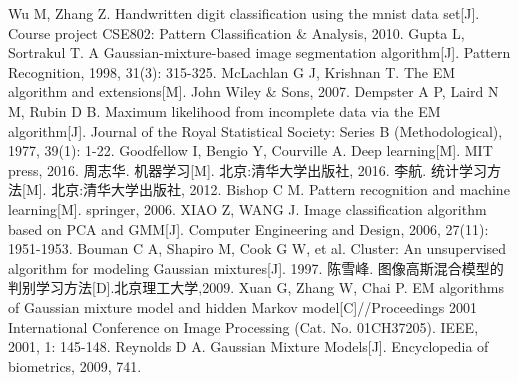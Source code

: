 \documentclass[UTF8]{ctexart}
\begin{document}
\clearpage

\begin{thebibliography}{99}
	Wu M, Zhang Z. Handwritten digit classification using the mnist data set[J]. Course project CSE802: Pattern Classification \& Analysis, 2010.
	Gupta L, Sortrakul T. A Gaussian-mixture-based image segmentation algorithm[J]. Pattern Recognition, 1998, 31(3): 315-325.
	McLachlan G J, Krishnan T. The EM algorithm and extensions[M]. John Wiley \& Sons, 2007. 
	Dempster A P, Laird N M, Rubin D B. Maximum likelihood from incomplete data via the EM algorithm[J]. Journal of the Royal Statistical Society: Series B (Methodological), 1977, 39(1): 1-22. 
	Goodfellow I, Bengio Y, Courville A. Deep learning[M]. MIT press, 2016.
	周志华. 机器学习[M]. 北京:清华大学出版社, 2016.
	李航. 统计学习方法[M]. 北京:清华大学出版社, 2012.
	Bishop C M. Pattern recognition and machine learning[M]. springer, 2006.
	XIAO Z, WANG J. Image classification algorithm based on PCA and GMM[J]. Computer Engineering and Design, 2006, 27(11): 1951-1953.
	Bouman C A, Shapiro M, Cook G W, et al. Cluster: An unsupervised algorithm for modeling Gaussian mixtures[J]. 1997.
	陈雪峰. 图像高斯混合模型的判别学习方法[D].北京理工大学,2009.
	Xuan G, Zhang W, Chai P. EM algorithms of Gaussian mixture model and hidden Markov model[C]//Proceedings 2001 International Conference on Image Processing (Cat. No. 01CH37205). IEEE, 2001, 1: 145-148.
	Reynolds D A. Gaussian Mixture Models[J]. Encyclopedia of biometrics, 2009, 741.
\end{thebibliography}
\end{document}
